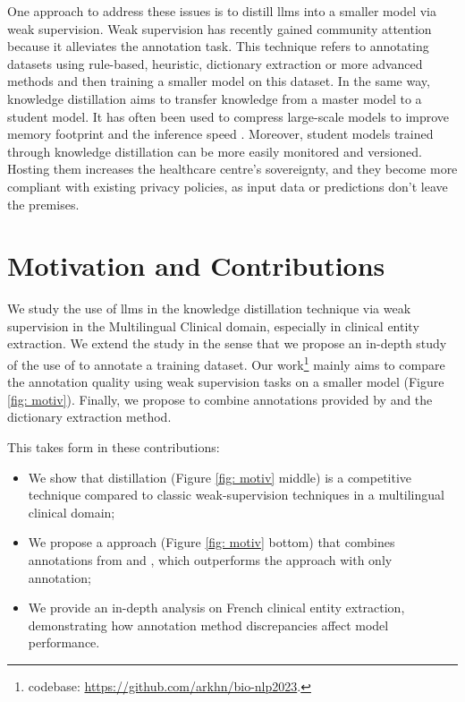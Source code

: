One approach to address these issues is to distill \glspl{llm} into a smaller model via weak supervision. 
Weak supervision has recently gained community attention because it alleviates the annotation task. This technique refers to annotating datasets using rule-based, heuristic, dictionary extraction or more advanced methods and then training a smaller model on this dataset.
In the same way, knowledge distillation aims to transfer knowledge from a master model to a student model. It has often been used to compress large-scale models to improve memory footprint and the inference speed \citep{Li2021DynamicModels}. 
Moreover, student models trained through knowledge distillation can be more easily monitored and versioned. Hosting them increases the healthcare centre's sovereignty, and they become more compliant with existing privacy policies, as input data or predictions don't leave the premises.

\section{Motivation and Contributions}
We study the use of \glspl{llm} in the knowledge distillation technique via weak supervision in the Multilingual Clinical domain, especially in clinical entity extraction. We extend the \citet{Agrawal2022LargeExtractors} study in the sense that we propose an in-depth study of the use of \instruct to annotate a training dataset. Our work\footnote{codebase: \url{https://github.com/arkhn/bio-nlp2023}.} mainly aims to compare the annotation quality using weak supervision tasks on a smaller model (Figure \ref{fig: motiv}). Finally, we propose to combine annotations provided by \instruct and the dictionary extraction method.

This takes form in these contributions:
\begin{itemize}
    \item We show that \distilmodels distillation (Figure \ref{fig: motiv} middle) is a competitive technique compared to classic weak-supervision techniques in a multilingual clinical domain;
    \item We propose a \hybridmodel approach (Figure \ref{fig: motiv} bottom) that combines annotations from \dict and \instruct, which outperforms the approach with only \instruct annotation;
    \item We provide an in-depth analysis on French clinical entity extraction, demonstrating how annotation method discrepancies affect model performance.
\end{itemize}

